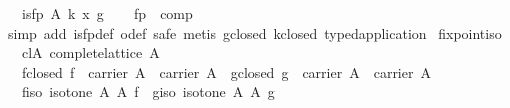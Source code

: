 \begin{isabellebody}
\ \ \ {}is{}fp\ A\ {}k\ x{}\ g{}\isanewline
%
\isadelimproof
\ \ %
\endisadelimproof
%
\isatagproof
{}\isamarkupfalse%
\ fp\ \ comp\ \isamarkupfalse%
\ {}simp\ add{}\ is{}fp{}def\ o{}def{}\ safe{}\ {}metis\ g{}closed\ k{}closed\ typed{}application{}{}{}%
\endisatagproof
{\isafoldproof}%
%
\isadelimproof
\isanewline
%
\endisadelimproof
\isanewline
{}\isamarkupfalse%
\ fixpoint{}iso{}\isanewline
\ \ \ cl{}A{}\ {}complete{}lattice\ A{}\isanewline
\ \ \ f{}closed{}\ {}f\ {}\ carrier\ A\ {}\ carrier\ A{}\ \ g{}closed{}\ {}g\ {}\ carrier\ A\ {}\ carrier\ A{}\isanewline
\ \ \ f{}iso{}\ {}isotone\ A\ A\ f{}\ \ g{}iso{}\ {}isotone\ A\ A\ g{}\isanewline

\end{isabellebody}
